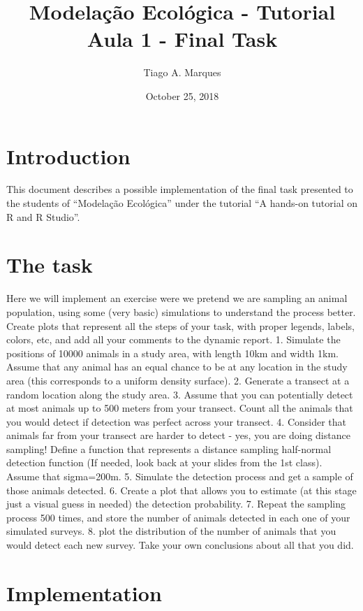 \documentclass[
]{article}
\title{Modelação Ecológica - Tutorial Aula 1 - Final Task}
\author{Tiago A. Marques}
\date{October 25, 2018}
\begin{document}
\maketitle

\tableofcontents

\section{Introduction}\label{introduction}

This document describes a possible implementation of the final task
presented to the students of ``Modelação Ecológica'' under the tutorial
``A hands-on tutorial on R and R Studio''.

\section{The task}\label{the-task}

Here we will implement an exercise were we pretend we are sampling an
animal population, using some (very basic) simulations to understand the
process better. Create plots that represent all the steps of your task,
with proper legends, labels, colors, etc, and add all your comments to
the dynamic report. 1. Simulate the positions of 10000 animals in a
study area, with length 10km and width 1km. Assume that any animal has
an equal chance to be at any location in the study area (this
corresponds to a uniform density surface). 2. Generate a transect at a
random location along the study area. 3. Assume that you can potentially
detect at most animals up to 500 meters from your transect. Count all
the animals that you would detect if detection was perfect across your
transect. 4. Consider that animals far from your transect are harder to
detect - yes, you are doing distance sampling! Define a function that
represents a distance sampling half-normal detection function (If
needed, look back at your slides from the 1st class). Assume that
sigma=200m. 5. Simulate the detection process and get a sample of those
animals detected. 6. Create a plot that allows you to estimate (at this
stage just a visual guess in needed) the detection probability. 7.
Repeat the sampling process 500 times, and store the number of animals
detected in each one of your simulated surveys. 8. plot the distribution
of the number of animals that you would detect each new survey. Take
your own conclusions about all that you did.

\section{Implementation}\label{implementation}
\end{document}
